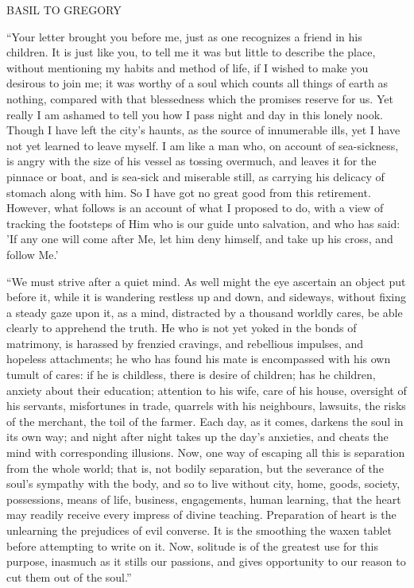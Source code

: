 BASIL TO GREGORY

``Your letter brought you before me, just as one recognizes a
friend in his children. It is just like you, to tell me it was but
little to describe the place, without mentioning my habits and
method of life, if I wished to make you desirous
to join me; it was worthy of a soul which counts all things of earth
as nothing, compared with that blessedness which the promises reserve
for us. Yet really I am ashamed to tell you how I pass night and day
in this lonely nook. Though I have left the city's haunts, as the
source of innumerable ills, yet I have not yet learned to leave
myself. I am like a man who, on account of sea-sickness, is angry with
the size of his vessel as tossing overmuch, and leaves it for the
pinnace or boat, and is sea-sick and miserable still, as carrying his
delicacy of stomach along with him. So I have got no great good from
this retirement. However, what follows is an account of what I
proposed to do, with a view of tracking the footsteps of Him who is
our guide unto salvation, and who has said: 'If any one will come
after Me, let him deny himself, and take up his cross, and follow Me.'

``We must strive after a quiet mind. As well might the eye
ascertain an object put before it, while it is wandering restless up
and down, and sideways, without fixing a steady gaze upon it, as a
mind, distracted by a thousand worldly cares, be able clearly to
apprehend the truth. He who is not yet yoked in the bonds of
matrimony, is harassed by frenzied cravings, and rebellious impulses,
and hopeless attachments; he who has found his mate is encompassed
with his own tumult of cares: if he is childless, there is desire of
children; has he children, anxiety about their education; attention to
his wife, care of his house, oversight of his servants, misfortunes in
trade, quarrels with his neighbours, lawsuits, the risks of the
merchant, the toil of the farmer. Each day, as it comes, darkens the
soul in its own way; and night after night takes up the day's
anxieties, and cheats the mind with corresponding illusions. Now, one
way of escaping all this is separation from the whole world; that is,
not bodily separation, but the severance of the soul's sympathy with
the body, and so to live without city, home, goods, society,
possessions, means of life, business, engagements, human learning,
that the heart may readily receive every impress of divine teaching.
Preparation of heart is the unlearning the prejudices of evil
converse. It is the smoothing the waxen tablet before attempting to
write on it. Now, solitude is of the greatest use for this purpose,
inasmuch as it stills our passions, and gives opportunity to our
reason to cut them out of the soul.''

